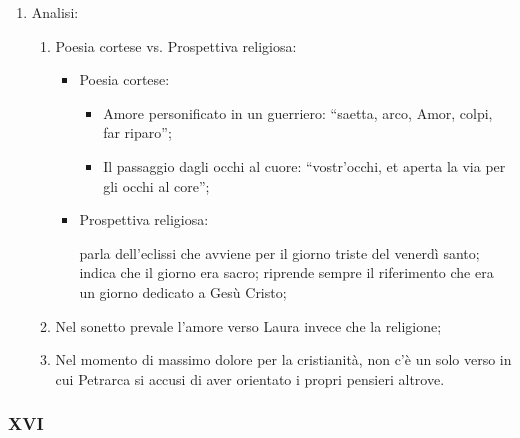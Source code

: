 \documentclass{article}
\begin{document}
\begin{enumerate}
\begin{enumerate}[label=]
\begin{itemize}[label=]
                \end{itemize}
        \end{enumerate}
    \item Analisi:
        \begin{enumerate}[label=]
            \item Poesia cortese vs. Prospettiva religiosa:
                \begin{itemize}[label=]
                    \item Poesia cortese:
                        \begin{itemize}
                            \item Amore personificato in un guerriero:
                                ``saetta, arco, Amor, colpi, far riparo'';
                            \item Il passaggio dagli occhi al cuore:
                                ``vostr'occhi, et aperta la via per gli occhi al core'';
                        \end{itemize}
                    \item Prospettiva religiosa:
                        \begin{itemize}
                             parla dell'eclissi che avviene per
                                il giorno triste del venerdì santo;
                             indica che il giorno era sacro;
                             riprende sempre il riferimento
                                che era un giorno dedicato a Gesù Cristo;
                        \end{itemize}
                \end{itemize}
            \item Nel sonetto prevale l'amore verso Laura invece che la religione;
            \item Nel momento di massimo dolore per la cristianità, non c'è un solo verso in
                cui Petrarca si accusi di aver orientato i propri pensieri altrove. 
        \end{enumerate}
\end{enumerate}


\newpage
\subsubsection{XVI}
\end{document}
